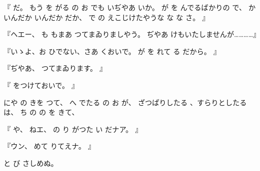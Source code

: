 『
だ。
もう
を
がる
の
お
でも
いぢやあ
いか。
が
を
んでるばかりの
で、
かいんだか
いんだか
だか、
で
の
えこじけたやうな
な
な
さ。
』

『ヘエー、
も
もまあ
つてまゐりましやう。
ぢやあ
けもいたしませんが…………』

『いゝよ、お
ひでない、さあ
くおいで。
が
を
れて
る
だから。
』

『ぢやあ、
つてまゐります。
』

『
をつけておいで。
』

にや
の
きを
つて、
へ
でたる
の
お
が、
ざつぱりしたる
、すらりとしたる
は、
ち
の
の
を
きて、

『
や、
ねエ、
の
り
がつた
い
だナア。
』

『ウン、
めて
りてえナ。
』

と
び
さしめぬ。

